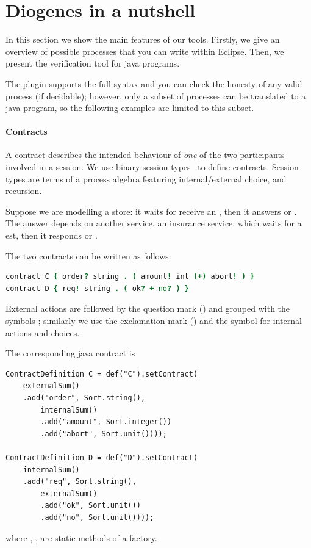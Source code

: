 \section{Diogenes in a nutshell}

In this section we show the main features of our tools.
%
Firstly, we give an overview of possible \coco processes
that you can write within Eclipse. 
Then, we present the verification tool for java programs.

The plugin supports the full \coco syntax and you can check
the honesty of any valid process (if decidable); however,
only a subset of processes can be translated to a java program, 
so the following examples are limited to this subset.

\paragraph{Contracts}
A contract describes the intended behaviour of \emph{one} of the two
participants involved in a session.  We use binary session
types~\cite{Honda98esop} to define contracts.  Session types are terms
of a process algebra featuring internal/external choice, and
recursion.

Suppose we are modelling a store: it waits for receive
an , then it answers  or .
The answer depends on another service, \ie an insurance service,
which waits for a est, then it responds  or .

The two contracts can be written as follows:
%
\begin{lstlisting}[language=coco,basicstyle=\scriptsize\ttfamily]
contract C { order? string . ( amount! int (+) abort! ) }
contract D { req! string . ( ok? + no? ) }
\end{lstlisting}
External actions are followed by the question mark () and grouped
with the symbols \code{+}; similarly we use the
exclamation mark (\code{!}) and the symbol \code{(+)} for
internal actions and choices.

The corresponding java contract is
\begin{mdframed}
\begin{verbatim}
ContractDefinition C = def("C").setContract(
    externalSum()
    .add("order", Sort.string(), 
        internalSum()
        .add("amount", Sort.integer())
        .add("abort", Sort.unit())));
        
ContractDefinition D = def("D").setContract(
    internalSum()
    .add("req", Sort.string(), 
        externalSum()
        .add("ok", Sort.unit())
        .add("no", Sort.unit())));
\end{verbatim}
\end{mdframed}
where , ,  
are static methods of a factory.


